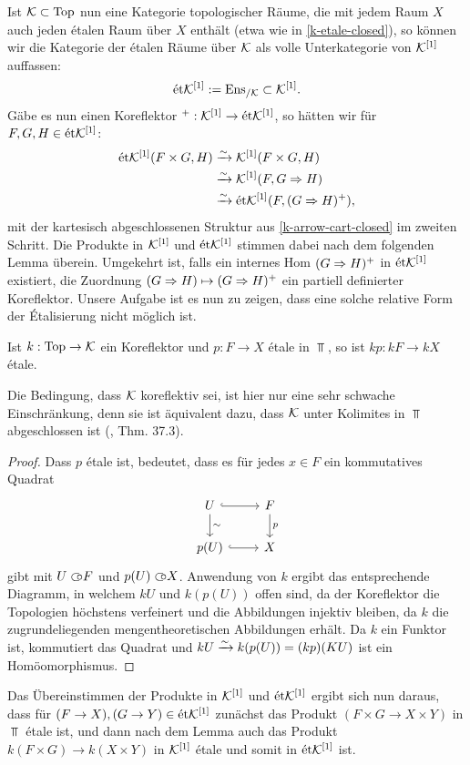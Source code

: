 Ist $\mathcal{K} \subset \operatorname{Top}$ nun eine Kategorie topologischer Räume, die mit
jedem Raum $X$ auch jeden étalen Raum über $X$ enthält (etwa wie in
\ref{k-etale-closed}), so können wir die Kategorie der étalen Räume
über $\mathcal{K}$ als volle Unterkategorie von $\mathcal{K}^{[1]}$ auffassen:
\[ \mathrm{\acute{e}t} \mathcal{K}^{[1]} := \operatorname{Ens}_{/\mathcal{K}} \subset \mathcal{K}^{[1]}. \]
Gäbe es nun einen Koreflektor $^+: \mathcal{K}^{[1]} \to \mathrm{\acute{e}t} \mathcal{K}^{[1]}$, so hätten wir
für $F, G, H \in \mathrm{\acute{e}t} \mathcal{K}^{[1]}$:
\begin{align*}
  \mathrm{\acute{e}t} \mathcal{K}^{[1]}(F \times G, H)
  &\xrightarrow[]{\sim} \mathcal{K}^{[1]}(F \times G, H) \\
  &\xrightarrow[]{\sim} \mathcal{K}^{[1]}(F, G \Rightarrow H) \\
  &\xrightarrow[]{\sim} \mathrm{\acute{e}t} \mathcal{K}^{[1]}(F, (G \Rightarrow H)^+),
\end{align*}
mit der kartesisch abgeschlossenen Struktur aus
\ref{k-arrow-cart-closed} im zweiten Schritt. Die Produkte in $\mathcal{K}^{[1]}$
und $\mathrm{\acute{e}t} \mathcal{K}^{[1]}$ stimmen dabei nach dem folgenden Lemma
überein. Umgekehrt ist, falls ein internes Hom $(G \Rightarrow H)^+$ in
$\mathrm{\acute{e}t} \mathcal{K}^{[1]}$ existiert, die Zuordnung $(G \Rightarrow H) \mapsto (G
\Rightarrow H)^+$ ein partiell definierter Koreflektor. Unsere Aufgabe
ist es nun zu zeigen, dass eine solche relative Form der Étalisierung
nicht möglich ist.

\begin{lemma}
  Ist $k: \operatorname{Top} \to \mathcal{K}$ ein Koreflektor und $p: F \to X$ étale in
  $\Top$, so ist $kp: kF \to kX$ étale.
\end{lemma}
\begin{bem}
  Die Bedingung, dass $\mathcal{K}$ koreflektiv sei, ist hier nur eine sehr
  schwache Einschränkung, denn sie ist äquivalent dazu, dass $\mathcal{K}$
  unter Kolimites in $\Top$ abgeschlossen ist (\cite{Herrlich},
  Thm. 37.3).
\end{bem}
\begin{proof}
  Dass $p$ étale ist, bedeutet, dass es für jedes $x \in F$ ein
  kommutatives Quadrat
  \[ 
  \begin{tikzcd}
    U \dar{\sim} \rar[hook] & F \dar{p} \\
    p(U) \rar[hook] & X
  \end{tikzcd}
  \]
  gibt mit $U \subset\kern-0.58em\circ F$ und $p(U) \subset\kern-0.58em\circ X$. Anwendung von $k$ ergibt
  das entsprechende Diagramm, in welchem $kU$ und $k(p(U))$ offen
  sind, da der Koreflektor die Topologien höchstens verfeinert und die
  Abbildungen injektiv bleiben, da $k$ die zugrundeliegenden
  mengentheoretischen Abbildungen erhält. Da $k$ ein Funktor ist,
  kommutiert das Quadrat und $kU \xrightarrow[]{\sim} k(p(U)) = (kp)(KU)$ ist ein
  Homöomorphismus.
\end{proof}
Das Übereinstimmen der Produkte in $\mathcal{K}^{[1]}$ und $\mathrm{\acute{e}t} \mathcal{K}^{[1]}$ ergibt sich
nun daraus, dass für $(F \to X), (G \to Y) \in \mathrm{\acute{e}t} \mathcal{K}^{[1]}$ zunächst das
Produkt $(F \times G \to X \times Y)$ in $\Top$ étale ist, und dann
nach dem Lemma auch das Produkt $k(F \times G) \to k(X \times Y)$ in
$\mathcal{K}^{[1]}$ étale und somit in $\mathrm{\acute{e}t} \mathcal{K}^{[1]}$ ist.

